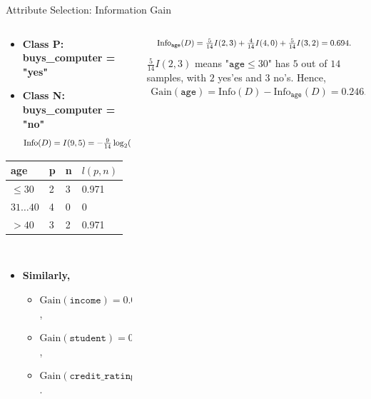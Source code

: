 \begin{frame}{Attribute Selection: Information Gain}
	\begin{columns}
		\begin{column}{0.45\textwidth}
			\begin{itemize}
				\item \textbf{Class P: buys\_computer = "yes"}
				\item \textbf{Class N: buys\_computer = "no"}
				      \begin{align*}
					      \resizebox{7cm}{!}{%
						      $\text{Info}(D) = I(9,5) = - \frac{9}{14}\log_2(\frac{9}{14})-\frac{5}{14} \log_2(\frac{5}{14}) = 0.94$
					      }
				      \end{align*}
			\end{itemize}
			\centering
			\begin{tabular}{|l|l|l|l|}
				\hline
				\cellcolor{faugray!62}age     & \cellcolor{faugray!62}p & \cellcolor{faugray!62}n & \cellcolor{faugray!62}$l(p,n)$ \\\hline
				\cellcolor{white}$\leq 30$    & 2                       & 3                       & 0.971                          \\\hline
				\cellcolor{white}$31\ldots40$ & 4                       & 0                       & 0                              \\\hline
				\cellcolor{white}$>40$        & 3                       & 2                       & 0.971                          \\\hline
			\end{tabular}\\[0.2cm]
			\begin{itemize}
				\item \textbf{Similarly,}
				      \begin{itemize}
					      \item $\text{Gain}(\texttt{income}) = 0.029$,
					      \item $\text{Gain}(\texttt{student}) = 0.090$,
					      \item $\text{Gain}(\texttt{credit\_rating}) = 0.048$.
				      \end{itemize}
			\end{itemize}
		\end{column}
		\begin{column}{0.45\textwidth}
			\vspace{-1.3cm}
			\begin{align*}
				\resizebox{7cm}{!}{%
				$\text{Info}_{\texttt{age}}(D) = \frac{5}{14}I(2,3) + \frac{4}{14} I(4,0) + \frac{5}{14} I(3,2) = 0.694$.
				}
			\end{align*}
			$\frac{5}{14} I(2,3)$ means "$\texttt{age} \leq 30$" has $5$ out of $14$ samples, with $2$ yes'es and $3$ no's. Hence,
			\begin{align*}
				\text{Gain}(\texttt{age}) = \text{Info}(D)-\text{Info}_{\texttt{age}}(D) = 0.246.
			\end{align*}

			\resizebox{6cm}{!}{%
				\centering
				
			}
		\end{column}
	\end{columns}
\end{frame}

